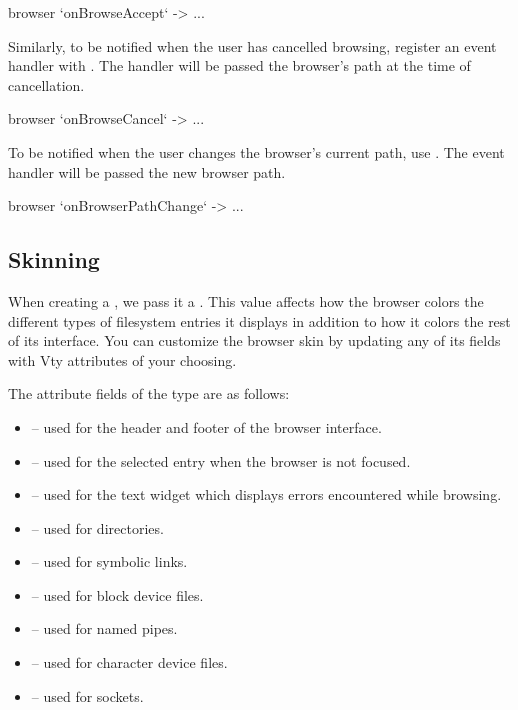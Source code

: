 \begin{haskellcode}
 browser `onBrowseAccept` \path -> ...
\end{haskellcode}

Similarly, to be notified when the user has cancelled browsing,
register an event handler with .  The handler will
be passed the browser's path at the time of cancellation.

\begin{haskellcode}
 browser `onBrowseCancel` \path -> ...
\end{haskellcode}

To be notified when the user changes the browser's current path, use
.  The event handler will be passed the
new browser path.

\begin{haskellcode}
 browser `onBrowserPathChange` \path -> ...
\end{haskellcode}

\subsection{Skinning}

When creating a , we pass it a .  This
value affects how the browser colors the different types of filesystem
entries it displays in addition to how it colors the rest of its
interface.  You can customize the browser skin by updating any of its
fields with Vty attributes of your choosing.


The attribute fields of the  type are as follows:

\begin{itemize}
\item {} -- used for the header and footer of the
  browser interface.
\item {} -- used for the selected entry when
  the browser is not focused.
\item {} -- used for the text widget which displays
  errors encountered while browsing.
\item {} -- used for directories.
\item {} -- used for symbolic links.
\item {} -- used for block device files.
\item {} -- used for named pipes.
\item {} -- used for character device files.
\item {} -- used for sockets.
\end{itemize}

